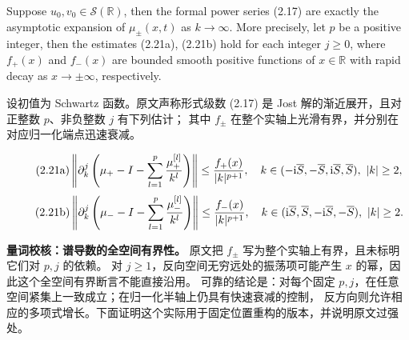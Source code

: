 \begin{paperpropositionen}\label{prop:2.2}
Suppose $u_0,v_0\in\mathcal S(\mathbb R)$, then the formal power series (2.17) are exactly the asymptotic expansion of $\mu_\pm(x,t)$ as $k\to\infty$.
More precisely, let $p$ be a positive integer, then the estimates (2.21a), (2.21b) hold for each integer $j\ge0$, where $f_+(x)$ and $f_-(x)$ are bounded smooth positive functions of $x\in\mathbb R$ with rapid decay as $x\to\pm\infty$, respectively.
\end{paperpropositionen}
\begin{paperpropositioncn*}
设初值为 Schwartz 函数。原文声称形式级数 (2.17) 是 Jost 解的渐近展开，且对正整数 $p$、非负整数 $j$ 有下列估计；
其中 $f_\pm$ 在整个实轴上光滑有界，并分别在对应归一化端点迅速衰减。
\end{paperpropositioncn*}
\begin{equation}
\originaleq{2.21a}
\left\|\partial_k^j\left(\mu_+-I-\sum\limits_{l=1}^{p}\dfrac{\mu_+^{[l]}}{k^l}\right)\right\|
\le\dfrac{f_+(x)}{|k|^{p+1}},\quad
k\in(-\ii\overline S,-\overline S,\ii\overline S,\overline S),\ |k|\ge2,
\end{equation}
\begin{equation}
\originaleq{2.21b}
\left\|\partial_k^j\left(\mu_--I-\sum\limits_{l=1}^{p}\dfrac{\mu_-^{[l]}}{k^l}\right)\right\|
\le\dfrac{f_-(x)}{|k|^{p+1}},\quad
k\in(\ii\overline S,\overline S,-\ii\overline S,-\overline S),\ |k|\ge2.
\end{equation}
\begin{note}
\textbf{量词校核：谱导数的全空间有界性。}
原文把 $f_\pm$ 写为整个实轴上有界，且未标明它们对 $p,j$ 的依赖。
对 $j\ge1$，反向空间无穷远处的振荡项可能产生 $x$ 的幂，因此这个全空间有界断言不能直接沿用。
可靠的结论是：对每个固定 $p,j$，在任意空间紧集上一致成立；在归一化半轴上仍具有快速衰减的控制，
反方向则允许相应的多项式增长。下面证明这个实际用于固定位置重构的版本，并说明原文过强处。
\end{note}
